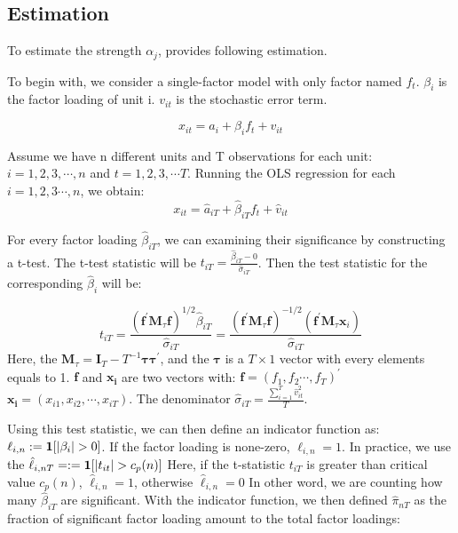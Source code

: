 \documentclass[12pt]{article}
\begin{document}
	\subsection{Estimation}\label{estimation}
To estimate the strength $\alpha_j$,  provides following estimation.

To begin with, we consider a single-factor model with only factor named $f_t$. 
 $\beta_{i}$ is the factor loading of unit i.
$v_{it}$ is the stochastic error term.

\[  x_{it} = a_{i} +  \beta_{i}f_{t} + v_{it} \tag{2} \label{estimation_model}\]

Assume we have n different units and T observations for each unit: $i = 1, 2, 3, \cdots, n$ and $t = 1,2,3, \cdots T$.
Running the OLS regression for each $i = 1,2,3\cdots, n$, we obtain:
\[   x_{it} = \hat{a}_{iT} +  \hat{\beta}_{iT}f_{t} + \hat{v}_{it}  \]

For every factor loading $\hat{\beta}_{iT}$, we can examining their significance by constructing a t-test.
The t-test statistic will be $t_{iT} = \frac{\hat{\beta}_{iT} - 0}{\hat{\sigma}_{iT}}$.  
Then the test statistic for the corresponding $\hat{\beta}_i$ will be:

\[t_{i T}=\frac{\left(\mathbf{f}^{\prime} \mathbf{M}_{\tau} \mathbf{f}\right)^{1 / 2} \hat{\beta}_{i T}}{\hat{\sigma}_{i T}}=\frac{\left(\mathbf{f}^{\prime} \mathbf{M}_{\tau} \mathbf{f}\right)^{-1 / 2}\left(\mathbf{f}^{\prime} \mathbf{M}_{\tau} \mathbf{x}_{i}\right)}{\hat{\sigma}_{i T}} \tag{3} \label{test_statistic} \]
Here, the $\mathbf{M}_{\tau} = \mathbf{I}_T - T^{-1}\mathbf{\tau}\mathbf{\tau^\prime}$, and the $\mathbf{\tau}$ is a $T\times 1$ vector with every elements equals to 1.
$\mathbf{f}$ and $\mathbf{x_i}$ are two vectors with: $\mathbf{f} = (f_1, f_2 \cdots, f_T)^{\prime}$   $\mathbf{x_i} = (x_{i1}, x_{i2}, \cdots, x_{iT})$.
The denominator $\hat{\sigma}_{iT} = \frac{\sum_{i=1}^{T} \hat{v}^2_{it} }{T}$.

Using this test statistic, we can then define an indicator function as: $\ell_{i,n} := {\bf1}[|\beta_i|>0]$.
If the factor loading is none-zero, $\ell_{i,n} = 1$.
In practice, we use the $\hat{\ell}_{i,nT} = := {\bf1}[|t_{it}|>c_p(n)]$
Here, if the t-statistic $t_{iT}$ is greater than critical value $c_p(n)$,  $\hat{\ell}_{i,n} = 1$, otherwise $\hat{\ell}_{i,n} = 0$
In other word, we are counting how many $\hat{\beta}_{iT}$ are significant.
With the indicator function, we then defined $\hat{\pi}_{nT}$ as the fraction of significant factor loading amount to the total factor loadings:
\end{document}
